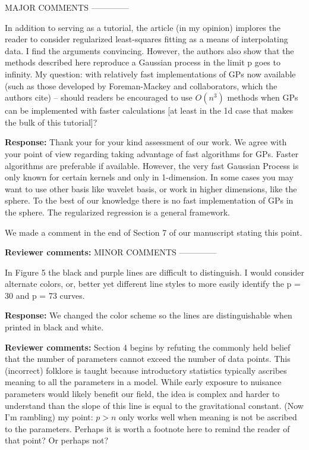 \documentclass{amsart}
\begin{document}
MAJOR COMMENTS
--------------

  In addition to serving as a tutorial, the article (in my opinion) implores the reader to consider regularized least-squares fitting as a means of interpolating data. I find the arguments convincing. However, the authors also show that the methods described here reproduce a Gaussian process in the limit p goes to infinity. My question: with relatively fast implementations of GPs now available (such as those developed by Foreman-Mackey and collaborators, which the authors cite) – should readers be encouraged to use $O(n^3)$ methods when GPs can be implemented with faster calculations [at least in the 1d case that makes the bulk of this tutorial]?


\textbf{Response:} Thank your for your kind assessment of our work. We agree with your point of view regarding taking advantage of fast algorithms for GPs. Faster algorithms are preferable if available. However, the very fast Gaussian Process is only known for certain kernels and only in 1-dimension. In some cases you may want to use other basis like wavelet basis, or work in higher dimensions, like the sphere. To the best of our knowledge there is no fast implementation of GPs in the sphere. The regularized regression is a general framework.

We made a comment in the end of Section 7 of our manuscript stating this point. 

\bigskip

\textbf{Reviewer comments:}
MINOR COMMENTS
--------------

  In Figure 5 the black and purple lines are difficult to distinguish. I would consider alternate colors, or, better yet different line styles to more easily identify the p = 30 and p = 73 curves.

\textbf{Response:} We changed the color scheme so the lines are distinguishable when printed in black and white.
 \bigskip
 
 \textbf{Reviewer comments:}
   Section 4 begins by refuting the commonly held belief that the number of parameters cannot exceed the number of data points. This (incorrect) folklore is taught because introductory statistics typically ascribes meaning to all the parameters in a model. While early exposure to nuisance parameters would likely benefit our field, the idea is complex and harder to understand than the slope of this line is equal to the gravitational constant. (Now I'm rambling) my point: $p > n$ only works well when meaning is not be ascribed to the parameters. Perhaps it is worth a footnote here to remind the reader of that point? Or perhaps not?
   
\end{document}
